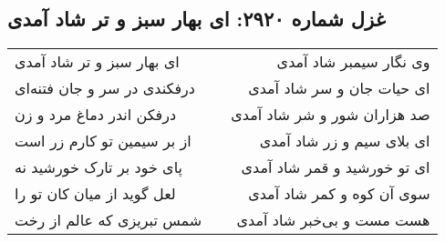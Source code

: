 \begin{center}
\section*{غزل شماره ۲۹۲۰: ای بهار سبز و تر شاد آمدی}
\label{sec:2920}
\begin{longtable}{l p{0.5cm} r}
ای بهار سبز و تر شاد آمدی
&&
وی نگار سیمبر شاد آمدی
\\
درفکندی در سر و جان فتنه‌ای
&&
ای حیات جان و سر شاد آمدی
\\
درفکن اندر دماغ مرد و زن
&&
صد هزاران شور و شر شاد آمدی
\\
از بر سیمین تو کارم زر است
&&
ای بلای سیم و زر شاد آمدی
\\
پای خود بر تارک خورشید نه
&&
ای تو خورشید و قمر شاد آمدی
\\
لعل گوید از میان کان تو را
&&
سوی آن کوه و کمر شاد آمدی
\\
شمس تبریزی که عالم از رخت
&&
هست مست و بی‌خبر شاد آمدی
\\
\end{longtable}
\end{center}
